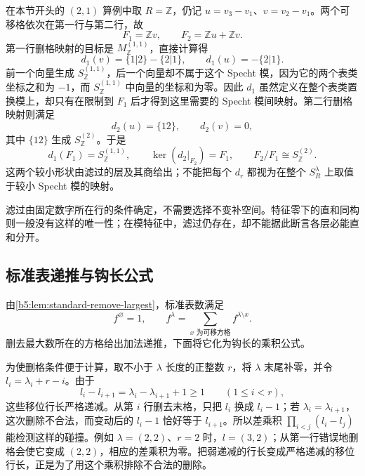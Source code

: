 在本节开头的 \((2,1)\) 算例中取 \(R=\mathbb Z\)，仍记 \(u=v_3-v_1\)、\(v=v_2-v_1\)。两个可移格依次在第一行与第二行，故
\[
	F_1=\mathbb Zv,\qquad F_2=\mathbb Zu+\mathbb Zv.
\]
第一行删格映射的目标是 \(M_{\mathbb Z}^{(1,1)}\)，直接计算得
\[
	d_1(v)=\{1|2\}-\{2|1\},\qquad d_1(u)=-\{2|1\}.
\]
前一个向量生成 \(S_{\mathbb Z}^{(1,1)}\)，后一个向量却不属于这个 Specht 模，因为它的两个表类坐标之和为 \(-1\)，而 \(S_{\mathbb Z}^{(1,1)}\) 中向量的坐标和为零。因此 \(d_1\) 虽然定义在整个表类置换模上，却只有在限制到 \(F_1\) 后才得到这里需要的 Specht 模间映射。第二行删格映射则满足
\[
	d_2(u)=\{12\},\qquad d_2(v)=0,
\]
其中 \(\{12\}\) 生成 \(S_{\mathbb Z}^{(2)}\)。于是
\[
	d_1(F_1)=S_{\mathbb Z}^{(1,1)},\qquad \ker(d_2|_{F_2})=F_1,\qquad F_2/F_1\cong S_{\mathbb Z}^{(2)}.
\]
这两个较小形状由滤过的层及其商给出；不能把每个 \(d_r\) 都视为在整个 \(S_R^\lambda\) 上取值于较小 Specht 模的映射。

\ProseParagraphBreak

滤过由固定数字所在行的条件确定，不需要选择不变补空间。特征零下的直和同构则一般没有这样的唯一性；在模特征中，滤过仍存在，却不能据此断言各层必能直和分开。

\subsection{标准表递推与钩长公式}
\label{b5:subsec:0605:02}

由\cref{b5:lem:standard-remove-largest}，标准表数满足
\begin{equation}\label{b5:eq:standard-tableau-recursion}
	f^\varnothing=1,\qquad f^\lambda=\sum_{x\text{ 为可移方格}}f^{\lambda\setminus x}.
\end{equation}
删去最大数所在的方格给出加法递推，下面将它化为钩长的乘积公式。

\ProseParagraphBreak

为使删格条件便于计算，取不小于 \(\lambda\) 长度的正整数 \(r\)，将 \(\lambda\) 末尾补零，并令 \(l_i=\lambda_i+r-i\)。由于
\[
	l_i-l_{i+1}=\lambda_i-\lambda_{i+1}+1\geq1 \qquad(1\leq i<r),
\]
这些移位行长严格递减。从第 \(i\) 行删去末格，只把 \(l_i\) 换成 \(l_i-1\)；若 \(\lambda_i=\lambda_{i+1}\)，这次删除不合法，而变动后的 \(l_i-1\) 恰好等于 \(l_{i+1}\)。所以差乘积 \(\prod_{i<j}(l_i-l_j)\) 能检测这样的碰撞。例如 \(\lambda=(2,2)\)、\(r=2\) 时，\(l=(3,2)\)；从第一行错误地删格会使它变成 \((2,2)\)，相应的差乘积为零。把弱递减的行长变成严格递减的移位行长，正是为了用这个乘积排除不合法的删除。

